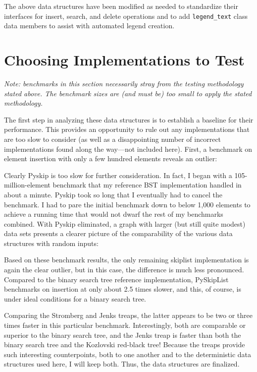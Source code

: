 \documentclass{article}
\begin{document}
The above data structures have been modified as needed to standardize their interfaces for insert, search, and delete operations and to add \verb|legend_text| class data members to assist with automated legend creation.

\section{Choosing Implementations to Test}

\emph{Note: benchmarks in this section necessarily stray from the testing methodology stated above. The benchmark sizes are (and must be) too small to apply the stated methodology.}

The first step in analyzing these data structures is to establish a baseline for their performance. This provides an opportunity to rule out any implementations that are too slow to consider (as well as a disappointing number of incorrect implementations found along the way---not included here). First, a benchmark on element insertion with only a few hundred elements reveals an outlier:



Clearly Pyskip is too slow for further consideration. In fact, I began with a 105-million-element benchmark that my reference BST implementation handled in about a minute. Pyskip took so long that I eventually had to cancel the benchmark. I had to pare the initial benchmark down to below 1,000 elements to achieve a running time that would not dwarf the rest of my benchmarks combined. With Pyskip eliminated, a graph with larger (but still quite modest) data sets presents a clearer picture of the comparability of the various data structures with random inputs:



Based on these benchmark results, the only remaining skiplist implementation is again the clear outlier, but in this case, the difference is much less pronounced. Compared to the binary search tree reference implementation, PySkipList benchmarks on insertion at only about 2.5 times slower, and this, of course, is under ideal conditions for a binary search tree.

Comparing the Stromberg and Jenks treaps, the latter appears to be two or three times faster in this particular benchmark. Interestingly, both are comparable or superior to the binary search tree, and the Jenks treap is faster than both the binary search tree and the Kozlovski red-black tree! Because the treaps provide such interesting counterpoints, both to one another and to the deterministic data structures used here, I will keep both. Thus, the data structures are finalized.
\end{document}
